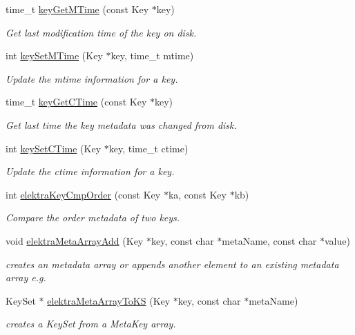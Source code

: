\begin{DoxyCompactItemize}
time\+\_\+t \hyperlink{group__meta_ga57689eb5691679071463b777ae786ae9}{key\+Get\+M\+Time} (const Key $\ast$key)
\begin{DoxyCompactList}\small\item\em Get last modification time of the key on disk. \end{DoxyCompactList}\item 
int \hyperlink{group__meta_ga481d8997187992fe4bbf288bc8ef4db7}{key\+Set\+M\+Time} (Key $\ast$key, time\+\_\+t mtime)
\begin{DoxyCompactList}\small\item\em Update the mtime information for a key. \end{DoxyCompactList}\item 
time\+\_\+t \hyperlink{group__meta_ga2c213c120cbe02201278ef7fb8cd94be}{key\+Get\+C\+Time} (const Key $\ast$key)
\begin{DoxyCompactList}\small\item\em Get last time the key metadata was changed from disk. \end{DoxyCompactList}\item 
int \hyperlink{group__meta_ga9f502ecab8ab43f0b17220fcc95f3fa5}{key\+Set\+C\+Time} (Key $\ast$key, time\+\_\+t ctime)
\begin{DoxyCompactList}\small\item\em Update the ctime information for a key. \end{DoxyCompactList}\item 
int \hyperlink{group__meta_gab8b30dfabb0867bd6899e60e7bd193a2}{elektra\+Key\+Cmp\+Order} (const Key $\ast$ka, const Key $\ast$kb)
\begin{DoxyCompactList}\small\item\em Compare the order metadata of two keys. \end{DoxyCompactList}\item 
void \hyperlink{group__meta_ga166c65c4eb2d758ced57b0bd74fb9a57}{elektra\+Meta\+Array\+Add} (Key $\ast$key, const char $\ast$meta\+Name, const char $\ast$value)
\begin{DoxyCompactList}\small\item\em creates an metadata array or appends another element to an existing metadata array e.\+g. \end{DoxyCompactList}\item 
Key\+Set $\ast$ \hyperlink{group__meta_gacee3e2d9285dd2bde975a09fdbe50502}{elektra\+Meta\+Array\+To\+K\+S} (Key $\ast$key, const char $\ast$meta\+Name)
\begin{DoxyCompactList}\small\item\em creates a Key\+Set from a Meta\+Key array. \end{DoxyCompactList}\item 

\end{DoxyCompactItemize}
